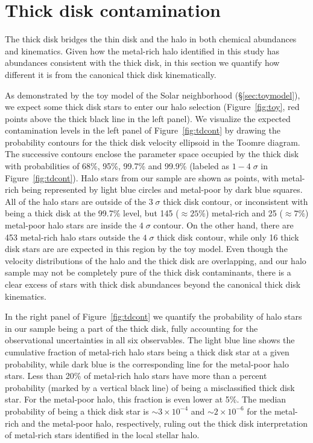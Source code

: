 \documentclass[apj, twocolappendix, numberedappendix, appendixfloats]{emulateapj}
\begin{document}



\appendix{}
\section{Thick disk contamination}
\label{sec:tdcontamination}
The thick disk bridges the thin disk and the halo in both chemical abundances and kinematics.
Given how the metal-rich halo identified in this study has abundances consistent with the thick disk, in this section we quantify how different it is from the canonical thick disk kinematically.

As demonstrated by the toy model of the Solar neighborhood (\S\ref{sec:toymodel}), we expect some thick disk stars to enter our halo selection (Figure~\ref{fig:toy}, red points above the thick black line in the left panel).
We visualize the expected contamination levels in the left panel of Figure~\ref{fig:tdcont} by drawing the probability contours for the thick disk velocity ellipsoid \citep{bensby2003} in the Toomre diagram.
The successive contours enclose the parameter space occupied by the thick disk with probabilities of 68\%, 95\%, 99.7\% and 99.9\% (labeled as $1-4\;\sigma$ in Figure~\ref{fig:tdcont}).
Halo stars from our sample are shown as points, with metal-rich being represented by light blue circles and metal-poor by dark blue squares.
All of the halo stars are outside of the $3\;\sigma$ thick disk contour, or inconsistent with being a thick disk at the 99.7\% level, but 145 ($\approx25\%$) metal-rich and 25 ($\approx7\%$) metal-poor halo stars are inside the $4\;\sigma$ contour.
On the other hand, there are 453 metal-rich halo stars outside the $4\;\sigma$ thick disk contour, while only 16 thick disk stars are are expected in this region by the toy model.
Even though the velocity distributions of the halo and the thick disk are overlapping, and our halo sample may not be completely pure of the thick disk contaminants, there is a clear excess of stars with thick disk abundances beyond the canonical thick disk kinematics.

In the right panel of Figure~\ref{fig:tdcont} we quantify the probability of halo stars in our sample being a part of the thick disk, fully accounting for the observational uncertainties in all six observables.
The light blue line shows the cumulative fraction of metal-rich halo stars being a thick disk star at a given probability, while dark blue is the corresponding line for the metal-poor halo stars.
Less than 20\% of metal-rich halo stars have more than a percent probability (marked by a vertical black line) of being a misclassified thick disk star.
For the metal-poor halo, this fraction is even lower at 5\%.
The median probability of being a thick disk star is $\sim3\times10^{-4}$ and $\sim2\times10^{-6}$ for the metal-rich and the metal-poor halo, respectively, ruling out the thick disk interpretation of metal-rich stars identified in the local stellar halo.
\end{document}
